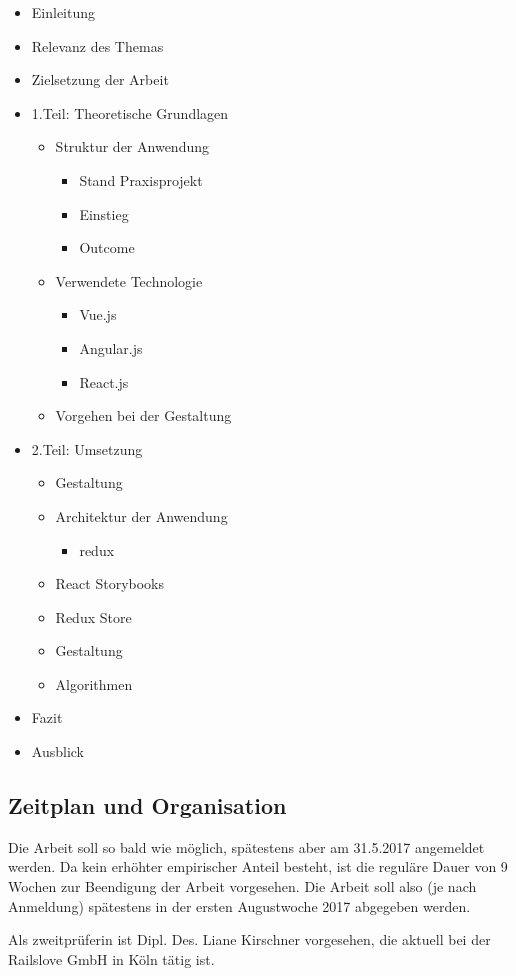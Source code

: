 \begin{itemize}
  \item Einleitung
  \item Relevanz des Themas
  \item Zielsetzung der Arbeit
  \item 1.Teil: Theoretische Grundlagen
  \begin{itemize}
    \item Struktur der Anwendung
    \begin{itemize}
      \item Stand Praxisprojekt
      \item Einstieg
      \item Outcome
    \end{itemize}
    \item Verwendete Technologie
    \begin{itemize}
      \item Vue.js
      \item Angular.js
      \item React.js
    \end{itemize}
    \item Vorgehen bei der Gestaltung
  \end{itemize}
  \item 2.Teil: Umsetzung
  \begin{itemize}
    \item Gestaltung
    \item Architektur der Anwendung
    \begin{itemize}
      \item redux
    \end{itemize}
    \item React Storybooks
    \item Redux Store
    \item Gestaltung
    \item Algorithmen
  \end{itemize}
  \item Fazit
  \item Ausblick
\end{itemize}

\subsection{Zeitplan und Organisation}
Die Arbeit soll so bald wie möglich, spätestens aber am 31.5.2017 angemeldet werden. Da kein erhöhter empirischer Anteil besteht, ist die reguläre Dauer von 9 Wochen zur Beendigung der Arbeit vorgesehen. Die Arbeit soll also (je nach Anmeldung) spätestens in der ersten Augustwoche 2017 abgegeben werden.

Als zweitprüferin ist Dipl. Des. Liane Kirschner vorgesehen, die aktuell bei der Railslove GmbH in Köln tätig ist.

